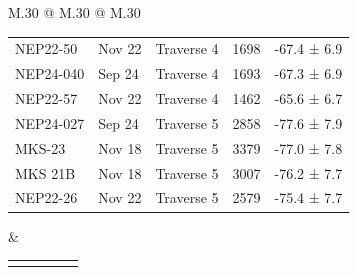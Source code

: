 \begin{landscape}
\begin{table}
\begin{tabular}{M{.30\textwidth} @{\hspace{4cm}} M{.30\textwidth} @{\hspace{4cm}} M{.30\textwidth}}
\begin{tabular}{l l l l l}
    NEP22-50 & Nov 22 & Traverse 4 & 1698 & -67.4 ±  6.9 \\
    NEP24-040 & Sep 24 & Traverse 4 & 1693 & -67.3 ±  6.9 \\
    NEP22-57 & Nov 22 & Traverse 4 & 1462 & -65.6 ±  6.7 \\
    \specialrule{0.2pt}{1pt}{1pt}
    NEP24-027 & Sep 24 & Traverse 5 & 2858 & -77.6 ±  7.9 \\
    MKS-23 & Nov 18 & Traverse 5 & 3379 & -77.0 ±  7.8 \\
    MKS 21B & Nov 18 & Traverse 5 & 3007 & -76.2 ±  7.7 \\
    NEP22-26 & Nov 22 & Traverse 5 & 2579 & -75.4 ±  7.7 \\
    \hline
    \end{tabular}
    &
    \begin{tabular}{l l l l l}
        \setlength\tabcolsep{0.1cm}


\end{tabular}
\end{tabular}
\end{table}
\end{landscape}
